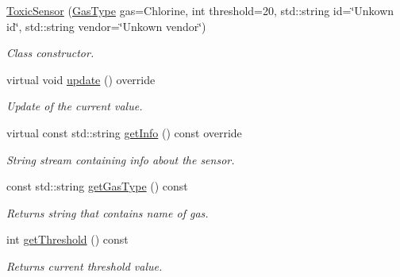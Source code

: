\begin{DoxyCompactItemize}
\item 
\hyperlink{classToxicSensor_a3d1f5f90e0561127e8ee3e5ee79c6473}{Toxic\+Sensor} (\hyperlink{classToxicSensor_a140f14965ad9a7e71fc8a5a2ed2c919b}{Gas\+Type} gas=Chlorine, int threshold=20, std\+::string id=\char`\"{}Unkown id\char`\"{}, std\+::string vendor=\char`\"{}Unkown vendor\char`\"{})
\begin{DoxyCompactList}\small\item\em Class constructor. \end{DoxyCompactList}\item 
virtual void \hyperlink{classToxicSensor_ae4c58761cf2ef02e1d782f7f13cc56ff}{update} () override
\begin{DoxyCompactList}\small\item\em Update of the current value. \end{DoxyCompactList}\item 
virtual const std\+::string \hyperlink{classToxicSensor_a544cfac25f1c5aa8c5e37de4ea4641b8}{get\+Info} () const override\hypertarget{classToxicSensor_a544cfac25f1c5aa8c5e37de4ea4641b8}{}\label{classToxicSensor_a544cfac25f1c5aa8c5e37de4ea4641b8}

\begin{DoxyCompactList}\small\item\em String stream containing info about the sensor. \end{DoxyCompactList}\item 
const std\+::string \hyperlink{classToxicSensor_a1f49ce67d6f7d871249b7d817940f6b8}{get\+Gas\+Type} () const \hypertarget{classToxicSensor_a1f49ce67d6f7d871249b7d817940f6b8}{}\label{classToxicSensor_a1f49ce67d6f7d871249b7d817940f6b8}

\begin{DoxyCompactList}\small\item\em Returns string that contains name of gas. \end{DoxyCompactList}\item 
int \hyperlink{classToxicSensor_a4a0ec4b0440b8c8b3cdbb703277cf87c}{get\+Threshold} () const \hypertarget{classToxicSensor_a4a0ec4b0440b8c8b3cdbb703277cf87c}{}\label{classToxicSensor_a4a0ec4b0440b8c8b3cdbb703277cf87c}

\begin{DoxyCompactList}\small\item\em Returns current threshold value. \end{DoxyCompactList}\end{DoxyCompactItemize}
